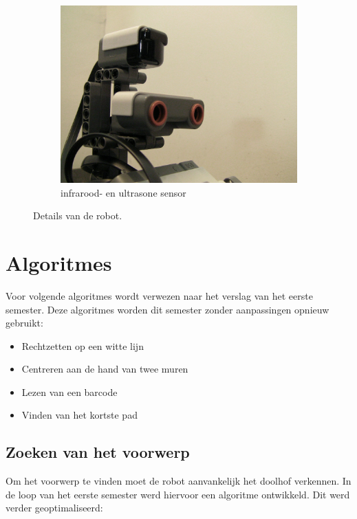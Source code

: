 \documentclass[tt2]{penoverslag}
\begin{document}
\begin{figure}
\begin{subfigure}[h]{0.325\textwidth}
		\includegraphics[width=\textwidth]{robotSensoren}
		\caption{infrarood- en ultrasone sensor}
	\end{subfigure}
\caption{Details van de robot.}
\label{fig:robotDetail}
\end{figure}


\section{Algoritmes}
Voor volgende algoritmes wordt verwezen naar het verslag van het eerste semester. Deze algoritmes worden dit semester zonder aanpassingen opnieuw gebruikt:
\begin{itemize}
	\item Rechtzetten op een witte lijn
	\item Centreren aan de hand van twee muren
	\item Lezen van een barcode
	\item Vinden van het kortste pad
\end{itemize}

\subsection{Zoeken van het voorwerp} %
\label{ssec:algoZoek}
Om het voorwerp te vinden moet de robot aanvankelijk het doolhof verkennen. In de loop van het eerste semester werd hiervoor een algoritme ontwikkeld. Dit werd verder geoptimaliseerd: 
\end{document}
